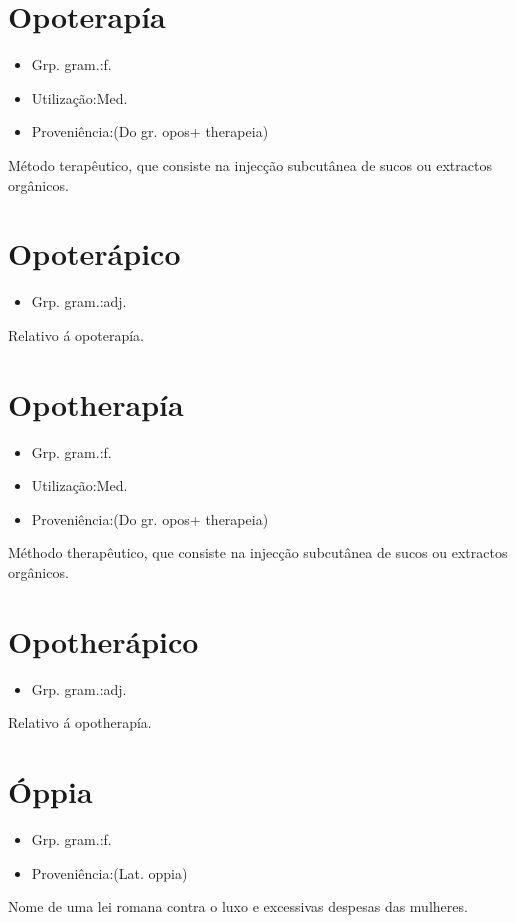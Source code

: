 \section{Opoterapía}
\begin{itemize}
\item {Grp. gram.:f.}
\end{itemize}
\begin{itemize}
\item {Utilização:Med.}
\end{itemize}
\begin{itemize}
\item {Proveniência:(Do gr. \textunderscore opos\textunderscore  + \textunderscore therapeia\textunderscore )}
\end{itemize}
Método terapêutico, que consiste na injecção subcutânea de sucos ou extractos orgânicos.
\section{Opoterápico}
\begin{itemize}
\item {Grp. gram.:adj.}
\end{itemize}
Relativo á opoterapía.
\section{Opotherapía}
\begin{itemize}
\item {Grp. gram.:f.}
\end{itemize}
\begin{itemize}
\item {Utilização:Med.}
\end{itemize}
\begin{itemize}
\item {Proveniência:(Do gr. \textunderscore opos\textunderscore  + \textunderscore therapeia\textunderscore )}
\end{itemize}
Méthodo therapêutico, que consiste na injecção subcutânea de sucos ou extractos orgânicos.
\section{Opotherápico}
\begin{itemize}
\item {Grp. gram.:adj.}
\end{itemize}
Relativo á opotherapía.
\section{Óppia}
\begin{itemize}
\item {Grp. gram.:f.}
\end{itemize}
\begin{itemize}
\item {Proveniência:(Lat. \textunderscore oppia\textunderscore )}
\end{itemize}
Nome de uma lei romana contra o luxo e excessivas despesas das mulheres.
